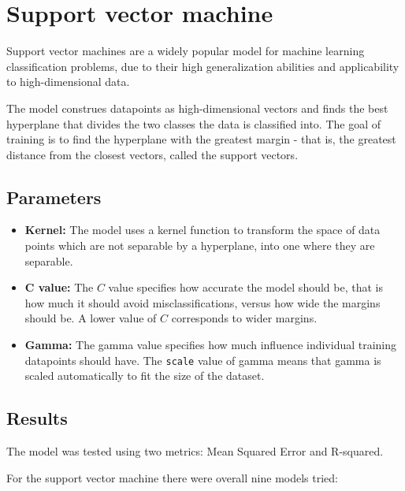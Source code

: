 \section{Support vector machine}
Support vector machines are a widely popular model for machine learning classification problems, due to their high generalization abilities and applicability to high-dimensional data.

The model construes datapoints as high-dimensional vectors and finds the best hyperplane that divides the two classes the data is classified into. The goal of training is to find the hyperplane with the greatest margin - that is, the greatest distance from the closest vectors, called the support vectors.

\subsection{Parameters}
\begin{itemize}
	\item \textbf{Kernel:} The model uses a kernel function to transform the space of data points which are not separable by a hyperplane, into one where they are separable.

	\item \textbf{C value:} The \(C\) value specifies how accurate the model should be, that is how much it should avoid misclassifications, versus how wide the margins should be. A lower value of \(C\) corresponds to wider margins.

	\item \textbf{Gamma:} The gamma value specifies how much influence individual training datapoints should have. The \verb|scale| value of gamma means that gamma is scaled automatically to fit the size of the dataset.
\end{itemize}


\subsection{Results}

The model was tested using two metrics: Mean Squared Error and R-squared.

For the support vector machine there were overall nine models tried:

